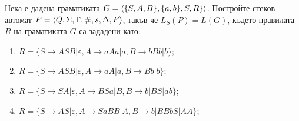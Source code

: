 \begin{problem}
  Нека е дадена граматиката $G = \langle{\{S,A,B\},\{a,b\},S,R\}}\rangle$.
  Постройте стеков автомат $P = \langle{Q,\Sigma,\Gamma,\#,s,\Delta,F}\rangle$, такъв че $L_S(P) = L(G)$, където правилата $R$ на граматиката $G$ са зададени като:
  \begin{enumerate} 
  \item
    $R = \{S\rightarrow ASB\vert \varepsilon, A\rightarrow aAa\vert a, B\rightarrow bBb\vert b\}$;
  \item
    $R = \{S\rightarrow ASB\vert \varepsilon, A\rightarrow aA\vert a, B\rightarrow Bb\vert b\}$;
  \item
    $R =\{S\rightarrow SA|\varepsilon,A\rightarrow BSa|B, B\rightarrow b|BS|ab\}$;
  \item
    $R = \{S\rightarrow AS|\varepsilon,A\rightarrow SaBB|A, B\rightarrow b|BBbS|AA\}$;

  \end{enumerate}
\end{problem}

